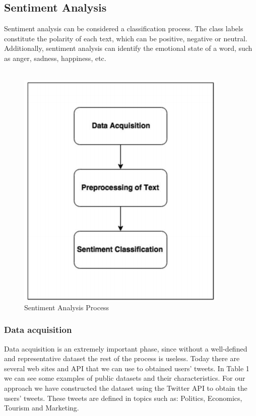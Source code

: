 \documentclass[preprint,12pt]{elsarticle}
\begin{document}
\subsection{\textbf{Sentiment Analysis}}
Sentiment analysis can be considered a classification process. The class labels constitute the polarity of each text, which can be positive, negative or neutral. Additionally, sentiment analysis can identify the emotional state of a word, such as anger, sadness, happiness, etc. \\
\\
\begin{figure}[h]
\centering\includegraphics[width=0.6\linewidth]{Screenshot1.png}
\caption{Sentiment Analysis Process}
\end{figure}
\subsubsection{\textbf{Data acquisition}}
Data acquisition is an extremely important phase, since without a well-defined and representative dataset the rest of the process is useless. Today there are several web sites and API that we can use to obtained users’ tweets. In Table 1 we can see some examples of public datasets and their characteristics. For our approach we have constructed the dataset using the Twitter API to obtain the users’ tweets. These tweets are defined in topics such as: Politics, Economics, Tourism and Marketing. \\
\end{document}
